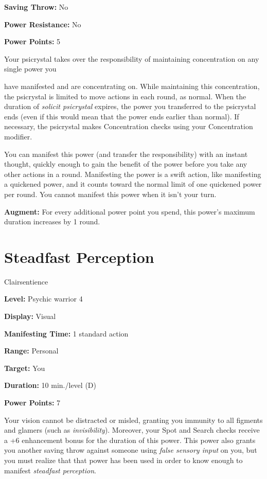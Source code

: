 \documentclass{article}
\begin{document}
\textbf{Saving Throw:} No

\textbf{Power Resistance:} No

\textbf{Power Points:} 5

Your psicrystal takes over the responsibility of maintaining concentration on any 
single power you

have manifested and are concentrating on. While maintaining this concentration, 
the psicrystal is limited to move actions in each round, as normal. When the duration 
of \textit{solicit psicrystal }expires, the power you transferred to the psicrystal 
ends (even if this would mean that the power ends earlier than normal). If necessary, 
the psicrystal makes Concentration checks using your Concentration modifier.

You can manifest this power (and transfer the responsibility) with an instant thought, 
quickly enough to gain the benefit of the power before you take any other actions 
in a round. Manifesting the power is a swift action, like manifesting a quickened 
power, and it counts toward the normal limit of one quickened power per round. 
You cannot manifest this power when it isn't your turn.

\textbf{Augment:} For every additional power point you spend, this power's maximum 
duration increases by 1 round.

\vspace{12pt}
\section*{Steadfast Perception}

Clairsentience

\textbf{Level:} Psychic warrior 4

\textbf{Display:} Visual

\textbf{Manifesting Time:} 1 standard action

\textbf{Range:} Personal

\textbf{Target:} You

\textbf{Duration:} 10 min./level (D)

\textbf{Power Points:} 7

Your vision cannot be distracted or misled, granting you immunity to all figments 
and glamers (such as \textit{invisibility}). Moreover, your Spot and Search checks 
receive a +6 enhancement bonus for the duration of this power. This power also 
grants you another saving throw against someone using \textit{false sensory input 
}on you, but you must realize that that power has been used in order to know enough 
to manifest \textit{steadfast perception}.
\end{document}
